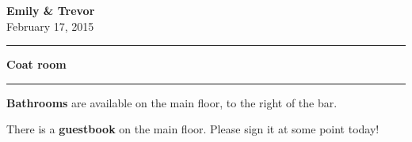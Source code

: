 \documentclass{sign}
\newif\ifte
\begin{document}
\begin{center}
  \ifte
      {\fontsize{42pt}{1em}\bf Trevor \& Emily} \\
  \else
      {\fontsize{42pt}{1em}\bf Emily \& Trevor} \\
  \fi
  {February 17, 2015}
\end{center}
\bigskip %

\hrule %

\vfill

\begin{center}
  {\fontsize{84pt}{1em}\bf Coat room} \\
\end{center}

\vfill

\hrule

\textbf{Bathrooms} are available on the main floor,
to the right of the bar.

There is a \textbf{guestbook} on the main floor.
Please sign it at some point today!
\end{document}
